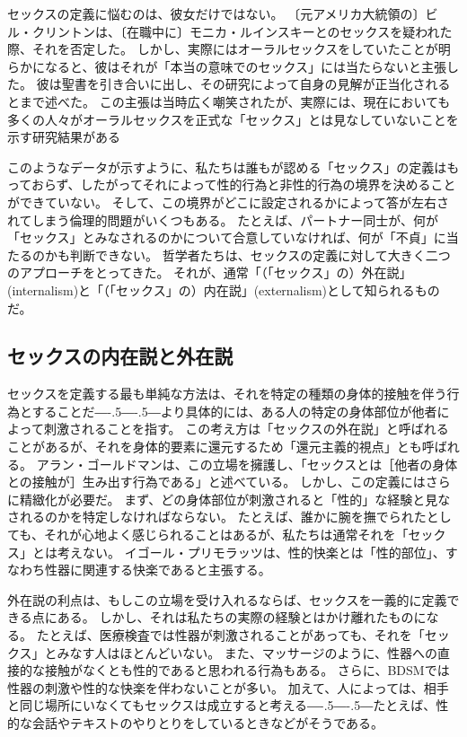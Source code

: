\documentclass[paper=a4,book,openany]{jlreq}
\newcommand{\ig}[1]{}           %
\def\DDASH{―\kern-.5\zw―\kern-.5\zw―} %
\begin{document}
セックスの定義に悩むのは、彼女だけではない。
〔元アメリカ大統領の〕ビル・クリントンは、〔在職中に〕モニカ・ルインスキーとのセックスを疑われた際、それを否定した。
しかし、実際にはオーラルセックスをしていたことが明らかになると、彼はそれが「本当の意味でのセックス」には当たらないと主張した。
彼は聖書を引き合いに出し、その研究によって自身の見解が正当化されるとまで述べた。
この主張は当時広く嘲笑されたが、実際には、現在においても多くの人々がオーラルセックスを正式な「セックス」とは見なしていないことを示す研究結果がある\citep{dotson-blake12:_explor_social_sexual}

このようなデータが示すように、私たちは誰もが認める「セックス」の定義はもっておらず、したがってそれによって性的行為と非性的行為の境界を決めることができていない。
そして、この境界がどこに設定されるかによって答が左右されてしまう倫理的問題がいくつもある。
たとえば、パートナー同士が、何が「セックス」とみなされるのかについて合意していなければ、何が「不貞」に当たるのかも判断できない。
哲学者たちは、セックスの定義に対して大きく二つのアプローチをとってきた。
それが、通常「（「セックス」の）外在説」(internalism)と「（「セックス」の）内在説」(externalism)として知られるものだ。

\subsection{セックスの内在説と外在説}

セックスを定義する最も単純な方法は、それを特定の種類の身体的接触を伴う行為とすることだ{\DDASH}より具体的には、ある人の特定の身体部位が他者によって刺激されることを指す。
この考え方は「セックスの外在説」と呼ばれることがあるが、それを身体的要素に還元するため「還元主義的視点」とも呼ばれる。
アラン・ゴールドマンは、この立場を擁護し、「セックスとは［他者の身体との接触が］生み出す行為である」と述べている\citep[p.268]{goldman77:_plain_sex}。\ig{Alan Goldman}
しかし、この定義にはさらに精緻化が必要だ。
まず、どの身体部位が刺激されると「性的」な経験と見なされるのかを特定しなければならない。
たとえば、誰かに腕を撫でられたとしても、それが心地よく感じられることはあるが、私たちは通常それを「セックス」とは考えない。
イゴール・プリモラッツは、性的快楽とは「性的部位」、すなわち性器に関連する快楽であると主張する\citep[p.46]{primoratz99:_ethic_and_sex}。

外在説の利点は、もしこの立場を受け入れるならば、セックスを一義的に定義できる点にある。
しかし、それは私たちの実際の経験とはかけ離れたものになる。
たとえば、医療検査では性器が刺激されることがあっても、それを「セックス」とみなす人はほとんどいない。
また、マッサージのように、性器への直接的な接触がなくとも性的であると思われる行為もある。
さらに、BDSMでは性器の刺激や性的な快楽を伴わないことが多い。
加えて、人によっては、相手と同じ場所にいなくてもセックスは成立すると考える{\DDASH}たとえば、性的な会話やテキストのやりとりをしているときなどがそうである\citep[pp.19--20]{soble06:_activ_sexual}。
\end{document}
